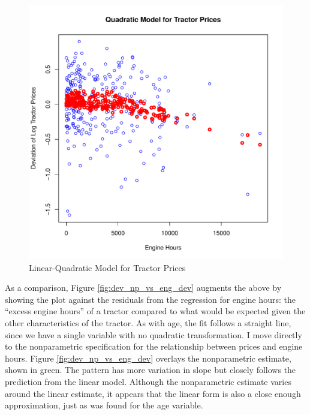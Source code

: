 \documentclass[11pt]{paper}
\begin{document}
\begin{figure}[h!]
  \centering
  \includegraphics[scale = 0.5, keepaspectratio=true]{../Figures/dev_vs_eng}
  \caption{Linear-Quadratic Model for Tractor Prices} \label{fig:dev_vs_eng}
\end{figure}



\pagebreak
As a comparison, Figure \ref{fig:dev_np_vs_eng_dev} 
augments the above by showing the plot against the 
residuals from the regression for engine hours:
the ``excess engine hours'' of a tractor compared to what would be 
expected given the other characteristics of the tractor. 
As with age, the fit follows a straight line,
since we have a single variable with no
quadratic transformation.
% 
I move directly to the nonparametric specification for 
the relationship between prices and engine hours.
Figure \ref{fig:dev_np_vs_eng_dev} 
overlays the nonparametric estimate, shown in green. 
The pattern has more variation in slope but 
closely follows the prediction from the linear model. 
Although the nonparametric estimate varies around the linear estimate,
it appears that the linear form
is also a close enough approximation, 
just as was found for the age variable.
\end{document}
